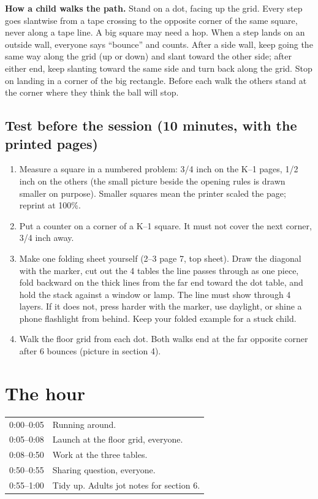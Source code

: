 \documentclass[11pt,letterpaper]{article}
\begin{document}
\textbf{How a child walks the path.} Stand on a dot, facing up the grid. Every step goes slantwise from a tape crossing to the opposite corner of the same square, never along a tape line. A big square may need a hop. When a step lands on an outside wall, everyone says ``bounce'' and counts. After a side wall, keep going the same way along the grid (up or down) and slant toward the other side; after either end, keep slanting toward the same side and turn back along the grid. Stop on landing in a corner of the big rectangle. Before each walk the others stand at the corner where they think the ball will stop.

\subsection{Test before the session (10 minutes, with the printed pages)}
\begin{enumerate}
\item Measure a square in a numbered problem: 3/4 inch on the K--1 pages, 1/2 inch on the others (the small picture beside the opening rules is drawn smaller on purpose). Smaller squares mean the printer scaled the page; reprint at 100\%.
\item Put a counter on a corner of a K--1 square. It must not cover the next corner, 3/4 inch away.
\item Make one folding sheet yourself (2--3 page 7, top sheet). Draw the diagonal with the marker, cut out the 4 tables the line passes through as one piece, fold backward on the thick lines from the far end toward the dot table, and hold the stack against a window or lamp. The line must show through 4 layers. If it does not, press harder with the marker, use daylight, or shine a phone flashlight from behind. Keep your folded example for a stuck child.
\item Walk the floor grid from each dot. Both walks end at the far opposite corner after 6 bounces (picture in section 4).
\end{enumerate}

\section{The hour}

\begin{tabularx}{\linewidth}{@{}l X@{}}
\toprule
0:00--0:05 & Running around.\\
0:05--0:08 & Launch at the floor grid, everyone.\\
0:08--0:50 & Work at the three tables.\\
0:50--0:55 & Sharing question, everyone.\\
0:55--1:00 & Tidy up. Adults jot notes for section 6.\\
\bottomrule
\end{tabularx}
\end{document}
